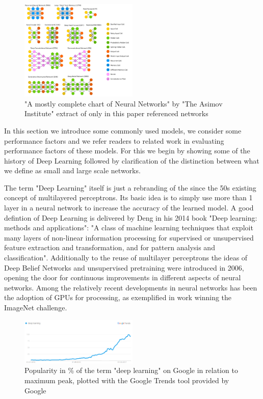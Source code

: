 \documentclass[conference]{IEEEtran}
\begin{document}
\begin{figure}
\centering
\includegraphics[width=0.5\textwidth]{neuralnetworks.png}
\caption{"A mostly complete chart of Neural Networks" by "The Asimov Institute" extract of only in this paper referenced networks\cite{zoo}}
\end{figure}



In this section we introduce some commonly used models, we consider some performance factors and we refer readers to related work in evaluating performance factors of these models. For this we begin by showing some of the history of Deep Learning followed by clarification of the distinction between what we define as small and large scale networks.

The term "Deep Learning" itself is just a rebranding of the since the 50s existing concept of multilayered perceptrons\cite{frank1957perceptron}. Its basic idea is to simply use more than 1 layer in a neural network to increase the accuracy of the learned model\cite{deeplearning101}. A good defintion of Deep Learning is delivered by Deng in his 2014 book "Deep learning: methods and applications"\cite{deng2014deep}: "A class of machine learning techniques that exploit many layers of non-linear information processing for supervised or unsupervised feature extraction and transformation, and for pattern analysis and classification". Additionally to the reuse of multilayer perceptrons the ideas of Deep Belief Networks and unsupervised pretraining were introduced in 2006\cite{hinton2006fast}, opening the door for continuous improvements in different aspects of neural networks. Among the relatively recent developments in neural networks has been the adoption of GPUs for processing, as exemplified in work winning the ImageNet challenge\cite{krizhevsky2012imagenet}.

\begin{figure}
\centering
\includegraphics[width=0.5\textwidth]{pop.png}
\caption{Popularity in \% of the term "deep learning" on Google in relation to maximum peak, plotted with the Google Trends tool provided by Google}
\end{figure}
\end{document}
